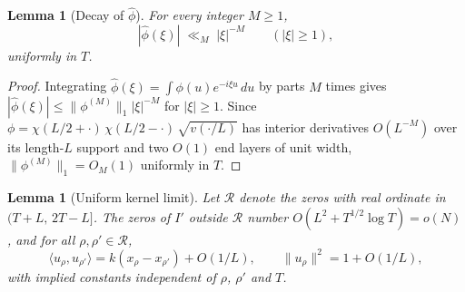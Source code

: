 \documentclass[11pt]{article}
\newtheorem{lemma}[theorem]{Lemma}
\theoremstyle{definition}
\newcommand{\cR}{\mathcal{R}}
\begin{document}
\begin{lemma}[Decay of $\widehat\phi$]\label{lem:phidecay}
For every integer $M\ge1$,
\begin{equation}\label{eq:phidecay}
  |\widehat\phi(\xi)|\;\ll_M\;|\xi|^{-M}\qquad(|\xi|\ge1),
\end{equation}
uniformly in $T$.
\end{lemma}

\begin{proof}
Integrating $\widehat\phi(\xi)=\int\phi(u)e^{-i\xi u}\,du$ by parts $M$ times
gives $|\widehat\phi(\xi)|\le\|\phi^{(M)}\|_1|\xi|^{-M}$ for $|\xi|\ge1$. Since
$\phi=\chi(L/2+\cdot)\,\chi(L/2-\cdot)\,\sqrt{v(\cdot/L)}$ has interior
derivatives $O(L^{-M})$ over its length-$L$ support and two $O(1)$ end layers of
unit width, $\|\phi^{(M)}\|_1=O_M(1)$ uniformly in $T$.
\end{proof}

\begin{lemma}[Uniform kernel limit]\label{lem:kernellimit}
Let $\cR$ denote the zeros with real ordinate in $(T+L,\,2T-L]$. The zeros of
$I'$ outside $\cR$ number $O(L^2+T^{1/2}\log T)=o(N)$, and for all
$\rho,\rho'\in\cR$,
\[
  \langle u_\rho,u_{\rho'}\rangle=k(x_\rho-x_{\rho'})+O(1/L),
  \qquad \|u_\rho\|^2=1+O(1/L),
\]
with implied constants independent of $\rho$, $\rho'$ and $T$.
\end{lemma}
\end{document}
